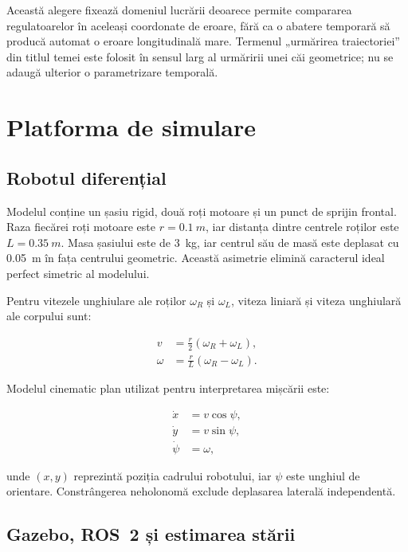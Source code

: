 \documentclass[12pt,a4paper,oneside]{report}
\begin{document}
Această alegere fixează domeniul lucrării deoarece permite compararea
regulatoarelor în aceleași coordonate de eroare, fără ca o abatere temporară să
producă automat o eroare longitudinală mare. Termenul „urmărirea traiectoriei”
din titlul temei este folosit în sensul larg al urmăririi unei căi geometrice;
nu se adaugă ulterior o parametrizare temporală.

\chapter{Platforma de simulare}

\section{Robotul diferențial}

Modelul conține un șasiu rigid, două roți motoare și un punct de sprijin frontal.
Raza fiecărei roți motoare este $r=\SI{0.1}{m}$, iar distanța dintre centrele
roților este $L=\SI{0.35}{m}$. Masa șasiului este de \SI{3}{kg}, iar centrul său
de masă este deplasat cu \SI{0.05}{m} în fața centrului geometric. Această
asimetrie elimină caracterul ideal perfect simetric al modelului.

Pentru vitezele unghiulare ale roților $\omega_R$ și $\omega_L$, viteza liniară
și viteza unghiulară ale corpului sunt:

\begin{align}
  v &= \frac{r}{2}\left(\omega_R+\omega_L\right), \\
  \omega &= \frac{r}{L}\left(\omega_R-\omega_L\right).
\end{align}

Modelul cinematic plan utilizat pentru interpretarea mișcării este:

\begin{align}
  \dot{x} &= v\cos\psi, \\
  \dot{y} &= v\sin\psi, \\
  \dot{\psi} &= \omega,
\end{align}

unde $(x,y)$ reprezintă poziția cadrului robotului, iar $\psi$ este unghiul de
orientare. Constrângerea neholonomă exclude deplasarea laterală independentă.

\section{Gazebo, ROS~2 și estimarea stării}
\end{document}
